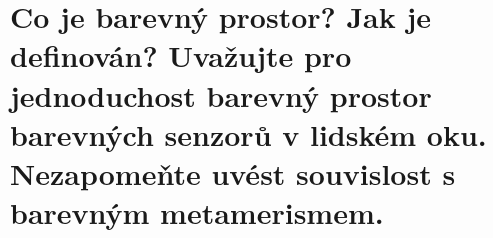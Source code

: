 \section{Co je barevný prostor? Jak je definován? Uvažujte pro jednoduchost barevný prostor barevných senzorů v lidském 
oku. Nezapomeňte uvést souvislost s barevným metamerismem.}